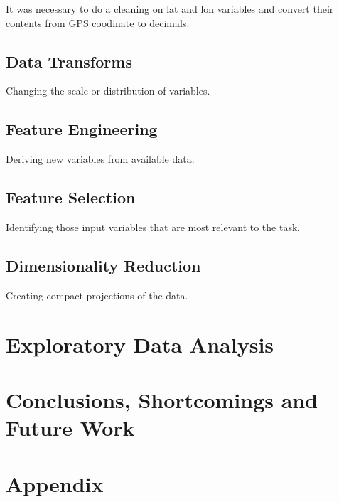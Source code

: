\documentclass[
  12pt,
]{report}
\begin{document}
It was necessary to do a cleaning on lat and lon variables and convert
their contents from GPS coodinate to decimals.

\hypertarget{data-transforms}{%
\section{Data Transforms}\label{data-transforms}}

Changing the scale or distribution of variables.

\hypertarget{feature-engineering}{%
\section{Feature Engineering}\label{feature-engineering}}

Deriving new variables from available data.

\hypertarget{feature-selection}{%
\section{Feature Selection}\label{feature-selection}}

Identifying those input variables that are most relevant to the task.

\hypertarget{dimensionality-reduction}{%
\section{Dimensionality Reduction}\label{dimensionality-reduction}}

Creating compact projections of the data.

\hypertarget{exploratory-data-analysis}{%
\chapter{Exploratory Data Analysis}\label{exploratory-data-analysis}}

\hypertarget{conclusions-shortcomings-and-future-work}{%
\chapter{Conclusions, Shortcomings and Future
Work}\label{conclusions-shortcomings-and-future-work}}

\hypertarget{appendix}{%
\chapter{Appendix}\label{appendix}}
\end{document}
